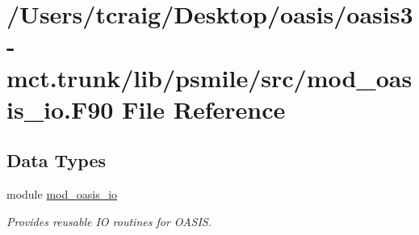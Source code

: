 \hypertarget{mod__oasis__io_8_f90}{\section{/\+Users/tcraig/\+Desktop/oasis/oasis3-\/mct.trunk/lib/psmile/src/mod\+\_\+oasis\+\_\+io.F90 File Reference}
\label{mod__oasis__io_8_f90}
}
\subsection*{Data Types}
\begin{DoxyCompactItemize}
\item 
module \hyperlink{classmod__oasis__io}{mod\+\_\+oasis\+\_\+io}
\begin{DoxyCompactList}\small\item\em Provides reusable I\+O routines for O\+A\+S\+I\+S. \end{DoxyCompactList}\end{DoxyCompactItemize}
